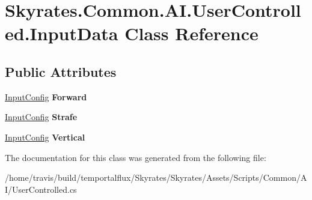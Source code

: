 \hypertarget{class_skyrates_1_1_common_1_1_a_i_1_1_user_controlled_1_1_input_data}{\section{Skyrates.\-Common.\-A\-I.\-User\-Controlled.\-Input\-Data Class Reference}
\label{class_skyrates_1_1_common_1_1_a_i_1_1_user_controlled_1_1_input_data}
}
\subsection*{Public Attributes}
\begin{DoxyCompactItemize}
\item 
\hypertarget{class_skyrates_1_1_common_1_1_a_i_1_1_user_controlled_1_1_input_data_af93478030c8c93806ebc9cee070b930d}{\hyperlink{class_skyrates_1_1_common_1_1_a_i_1_1_user_controlled_1_1_input_config}{Input\-Config} {\bfseries Forward}}\label{class_skyrates_1_1_common_1_1_a_i_1_1_user_controlled_1_1_input_data_af93478030c8c93806ebc9cee070b930d}

\item 
\hypertarget{class_skyrates_1_1_common_1_1_a_i_1_1_user_controlled_1_1_input_data_a5f05cd20ea241ae73136c8d9ef7bdfec}{\hyperlink{class_skyrates_1_1_common_1_1_a_i_1_1_user_controlled_1_1_input_config}{Input\-Config} {\bfseries Strafe}}\label{class_skyrates_1_1_common_1_1_a_i_1_1_user_controlled_1_1_input_data_a5f05cd20ea241ae73136c8d9ef7bdfec}

\item 
\hypertarget{class_skyrates_1_1_common_1_1_a_i_1_1_user_controlled_1_1_input_data_a2933dc5edef26e8100b18d1a8584da7e}{\hyperlink{class_skyrates_1_1_common_1_1_a_i_1_1_user_controlled_1_1_input_config}{Input\-Config} {\bfseries Vertical}}\label{class_skyrates_1_1_common_1_1_a_i_1_1_user_controlled_1_1_input_data_a2933dc5edef26e8100b18d1a8584da7e}

\end{DoxyCompactItemize}


The documentation for this class was generated from the following file\-:\begin{DoxyCompactItemize}
\item 
/home/travis/build/temportalflux/\-Skyrates/\-Skyrates/\-Assets/\-Scripts/\-Common/\-A\-I/User\-Controlled.\-cs\end{DoxyCompactItemize}
